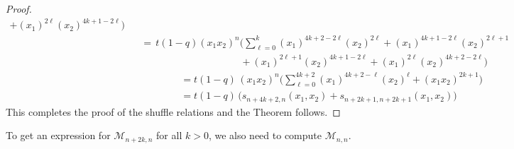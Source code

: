 \begin{proof}
\begin{eqnarray*}
+(x_1)^{2\ell}(x_2)^{4k+1-2\ell}\Big)\\
&&=\, 
t(1-q)(x_1x_2)^{n} \Big(\sum_{\ell=0}^{k} (x_1)^{4k+2-2\ell} (x_2)^{2\ell}+(x_1)^{4k+1-2\ell} (x_2)^{2\ell+1}\\
&&\qquad \qquad\qquad\qquad\qquad+(x_1)^{2\ell+1}(x_2)^{4k+1-2\ell}+(x_1)^{2\ell}(x_2)^{4k+2-2\ell}\Big)\\
&&\qquad \qquad =t(1-q)\, (x_1x_2)^{n}  \Big(\sum_{\ell=0}^{4k+2}(x_1)^{4k+2-\ell} (x_2)^{\ell} +(x_1x_2)^{2k+1}\Big)\\
&&\qquad \qquad =t(1-q)\, \Big(s_{n+4k+2,n}(x_1,x_2)+s_{n+2k+1,n+2k+1}(x_1,x_2)\Big)
\end{eqnarray*}
This completes the proof of the shuffle relations and the Theorem follows.
\end{proof}

To get an expression for ${\mathcal M}_{n+2k,n}$ for all $k>0$, we also need to compute ${\mathcal M}_{n,n}$.


